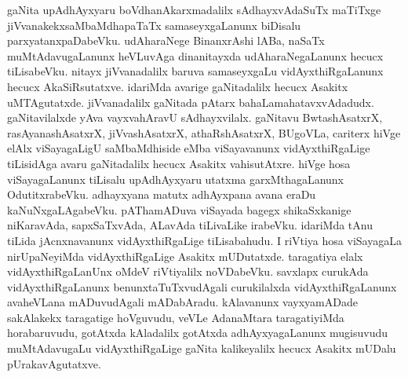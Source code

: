 gaNita upAdhAyxyaru boVdhanAkarxmadalilx sAdhayxvAdaSuTx maTiTxge jiVvanakekx\break saMbaMdhapaTaTx samaseyxgaLanunx biDisalu parxyatanxpaDabeVku. udAharaNege BinanxrAshi lABa, naSaTx muMtAdavugaLanunx heVLuvAga dinanitayxda udAharaNegaLanunx hecucx tiLisabeVku. nitayx jiVvanadalilx baruva samaseyxgaLu vidAyxthiRgaLanunx hecucx AkaSiRsutatxve. idariMda avarige gaNitadalilx hecucx Asakitx uMTAgutatxde. jiVvanadalilx gaNitada pAtarx bahaLa\break mahatavxvAdadudx. gaNitavilalxde yAva vayxvahAravU sAdhayxvilalx. gaNitavu BwtashAsatxrX, rasAyanashAsatxrX, jiVvashAsatxrX, athaRshAsatxrX, BUgoVLa, cariterx hiVge elAlx viSayagaLigU saMbaMdhiside eMba viSayavanunx vidAyxthiRgaLige tiLisidAga avaru gaNitadalilx hecucx Asakitx vahisutAtxre. hiVge hosa viSayagaLanunx tiLisalu upAdhAyxyaru utatxma garxMtha\-gaLanunx OdutitxrabeVku. adhayxyana matutx adhAyxpana avana eraDu kaNuNxgaLAgabeVku. pAThamADuva viSayada bagegx shikaSxkanige niKaravAda, sapxSaTxvAda, ALavAda tiLivaLike irabeVku. idariMda tAnu tiLida jAcnxnavanunx vidAyxthiRgaLige tiLisabahudu. I riVtiya hosa viSayagaLa nirUpaNeyiMda vidAyxthiRgaLige Asakitx mUDutatxde. taragatiya elalx vidAyxthiRgaLanUnx oMdeV riVtiyalilx noVDabeVku. savxlapx curukAda vidAyxthiR\-gaLanunx benunxtaTuTxvudAgali curukilalxda vidAyxthiRgaLanunx avaheVLana \-mADuvudAgali mADa\-bAradu. kAlavanunx vayxyamADade sakAlakekx taragatige hoVguvudu, veVLe AdanaMtara taragatiyiMda horabaruvudu, gotAtxda kAladalilx gotAtxda adhAyxyagaLanunx mugisu\-vudu muMtAdavugaLu vidAyxthiRgaLige gaNita kalikeyalilx hecucx Asakitx mUDalu pUraka\-vAgutatxve.


